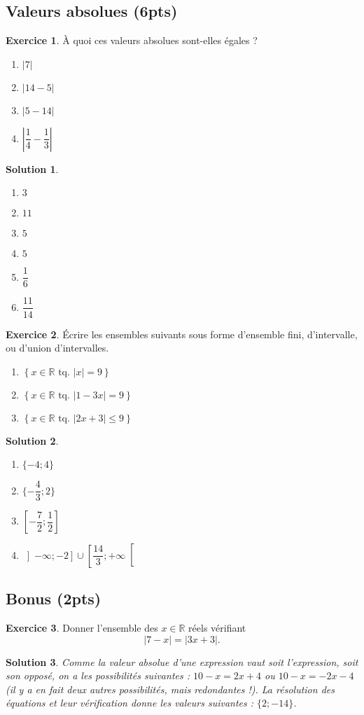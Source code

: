 \documentclass[a4paper, 14pt]{extarticle}
\theoremstyle{plain}
\newtheorem*{sol}{Solution}
\theoremstyle{definition}
\newtheorem{ex}{Exercice}
\newcommand{\R}{\mathbb{R}}
\newcommand{\xRtq}[1]{
	$\left\{ x \in \R \text{ tq. } #1 \right\}$
}
\newcommand{\vabs}[1]{
	\left| #1 \right|
}
\newcommand{\exe}[2]{
		\begin{ex} #1  \end{ex}
		\begin{sol} #2 \end{sol}
	}
\newcommand{\exe}[2]{
		\begin{ex} #1  \end{ex}
	}
\begin{document}
\subsection*{Valeurs absolues (6pts)}


\exe{
	À  quoi ces valeurs absolues sont-elles égales ?
	\begin{multicols}{2}
	\begin{enumerate}
		\item $\vabs{7}$
		\item $\vabs{14 - 5}$
		\item $\vabs{5-14}$
		\item $\vabs{\dfrac14 - \dfrac13}$
	\end{enumerate}
	\end{multicols}
}
{

	\begin{multicols}{2}
	\begin{enumerate}
		\item $3$
		\item $11$
		\item $5$
		\item $5$
		\item $\dfrac16$
		\item $\dfrac{11}{14}$
	\end{enumerate}
	\end{multicols}

}

\exe{
	Écrire les ensembles suivants sous forme d'ensemble fini, d'intervalle, ou d'union d'intervalles.
	\begin{multicols}{2}
	\begin{enumerate}
		\item \xRtq{\vabs{x} = 9}
		\item \xRtq{\vabs{1-3x} = 9}
		\item \xRtq{\vabs{2x + 3} \leq 9}
	\end{enumerate}
	\end{multicols}
}
{

	\begin{multicols}{2}
	\begin{enumerate}
		\item $\{ -4 ; 4\}$
		\item $ \{ -\dfrac43 ; 2 \}$
		\item $\left[ -\dfrac72 ; \dfrac12\right]$
		\item $\left]-\infty ; -2\right] \cup \left[ \dfrac{14}3 ; +\infty \right[$
	\end{enumerate}
	\end{multicols}

}

\subsection*{Bonus (2pts)}

\exe{
	Donner l'ensemble des $x\in\R$ réels vérifiant
		\[ |7 - x| = |3x + 3|. \]
}
{
	Comme la valeur absolue d'une expression vaut soit l'expression, soit son opposé, on a les possibilités suivantes : $10-x = 2x+4$ ou $10-x = -2x-4$ (il y a en fait deux autres possibilités, mais redondantes !).
	La résolution des équations et leur vérification donne les valeurs suivantes :
	$\{ 2 ; -14 \}$.
}
\end{document}
